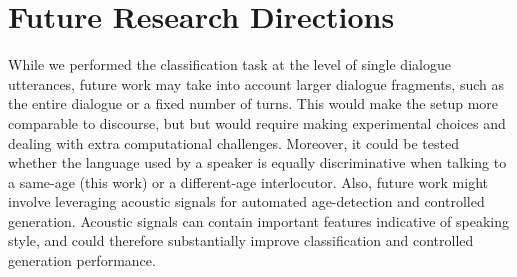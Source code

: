 
\section{Future Research Directions}

While we performed the classification task at the level of single dialogue utterances, future work may take into account larger dialogue fragments, such as the entire dialogue or a fixed number of turns. This would make the setup more comparable to discourse, but but would require making experimental choices and dealing with extra computational challenges. Moreover, it could be tested whether the language used by a speaker is equally discriminative when talking to a same-age (this work) or a different-age interlocutor. Also, future work might involve leveraging acoustic signals for automated age-detection and controlled generation. Acoustic signals can contain important features indicative of speaking style, and could therefore substantially improve classification and controlled generation performance.

